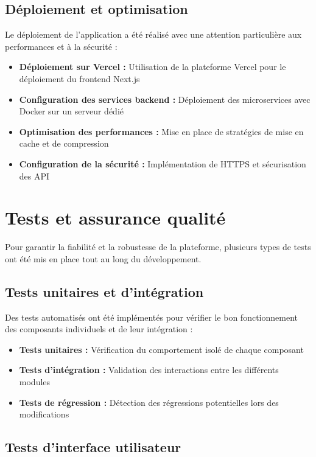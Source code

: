 \subsection{Déploiement et optimisation}

Le déploiement de l'application a été réalisé avec une attention particulière aux performances et à la sécurité :

\begin{itemize}
  \item \textbf{Déploiement sur Vercel :} Utilisation de la plateforme Vercel pour le déploiement du frontend Next.js
  \item \textbf{Configuration des services backend :} Déploiement des microservices avec Docker sur un serveur dédié
  \item \textbf{Optimisation des performances :} Mise en place de stratégies de mise en cache et de compression
  \item \textbf{Configuration de la sécurité :} Implémentation de HTTPS et sécurisation des API
\end{itemize}

\section{Tests et assurance qualité}

Pour garantir la fiabilité et la robustesse de la plateforme, plusieurs types de tests ont été mis en place tout au long du développement.

\subsection{Tests unitaires et d'intégration}

Des tests automatisés ont été implémentés pour vérifier le bon fonctionnement des composants individuels et de leur intégration :

\begin{itemize}
  \item \textbf{Tests unitaires :} Vérification du comportement isolé de chaque composant
  \item \textbf{Tests d'intégration :} Validation des interactions entre les différents modules
  \item \textbf{Tests de régression :} Détection des régressions potentielles lors des modifications
\end{itemize}

\subsection{Tests d'interface utilisateur}

